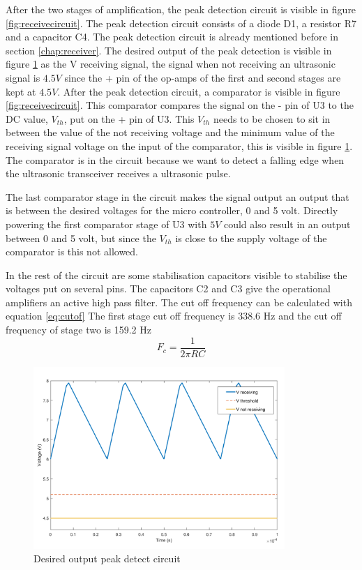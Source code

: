 After the two stages of amplification, the peak detection circuit is visible in figure \ref{fig:receivecircuit}. The peak detection circuit consists of a diode D1, a resistor R7 and a capacitor C4. The peak detection circuit is already mentioned before in section \ref{chap:receiver}. The desired output of the peak detection is visible in figure \ref{fig:waves_peak_detect} as the V receiving signal, the signal when not receiving an ultrasonic signal is $4.5V$ since the + pin of the op-amps of the first and second stages are kept at $4.5V$.
After the peak detection circuit, a comparator is visible in figure \ref{fig:receivecircuit}. This comparator compares the signal on the - pin of U3 to the DC value, $V_{th}$, put on the + pin of U3. This $V_{th}$ needs to be chosen to sit in between the value of the not receiving voltage and the minimum value of the receiving signal voltage on the input of the comparator, this is visible in figure \ref{fig:waves_peak_detect}. The comparator is in the circuit because we want to detect a falling edge when the ultrasonic transceiver receives a ultrasonic pulse.

The last comparator stage in the circuit makes the signal output an output that is between the desired voltages for the micro controller, 0 and 5 volt. Directly powering the first comparator stage of U3 with $5V$ could also result in an output between 0 and 5 volt, but since the $V_{th}$ is close to the supply voltage of the comparator is this not allowed.

In the rest of the circuit are some stabilisation capacitors visible to stabilise the voltages put on several pins. The capacitors C2 and C3 give the operational amplifiers an active high pass filter. The cut off frequency can be calculated with equation \ref{eq:cutof}
The first stage cut off frequency is 338.6 Hz and the cut off frequency of stage two is 159.2 Hz
\begin{equation}
\label{eq:cutof}
F_{c}= \frac{1}{2\pi RC}
\end{equation}

\begin{figure}[H]
\centering
\includegraphics[width=0.85\textwidth]{Figures/waves_peak_detect.png}
\caption{Desired output peak detect circuit}
\label{fig:waves_peak_detect}
\end{figure}

